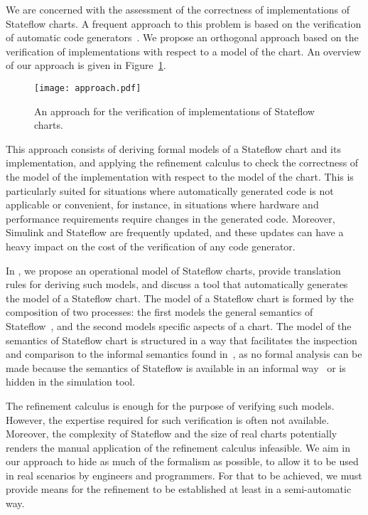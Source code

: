 \documentclass[submission]{eptcs}
\begin{document}
We are concerned with the assessment of the correctness of implementations of Stateflow charts.
A frequent approach to this problem is based on the verification of automatic code generators~\cite{Caspi2003,Toom2008,Lublinerman2009}. 
We propose an orthogonal approach based on the verification of implementations with respect to a model
of the chart. An overview of our approach is given in Figure~\ref{fig:approach}.


\begin{figure}
\centering
\texttt{[image: approach.pdf]}
\caption{An approach for the verification of implementations of Stateflow charts.}
\label{fig:approach}
\end{figure}

This approach consists of deriving formal models of a Stateflow chart and its implementation, and
applying the refinement calculus to check the correctness of the model of the implementation with respect to the model of the chart.
This is particularly suited for situations where automatically generated code is not applicable
or convenient, for instance, in situations where hardware and performance requirements require changes in the generated
code. Moreover, Simulink and Stateflow are frequently updated, and these updates can have
a heavy impact on the cost of the verification of any code generator.

In \cite{Miyazawa2011a}, we propose an operational model of Stateflow charts, provide translation rules for deriving such models, and discuss
a tool that automatically generates the model of a Stateflow chart. The model of a Stateflow chart is formed by the composition of two processes:
the first models the general semantics of Stateflow~\cite{Stateflow}, and the second models specific aspects of a chart.
The model of the semantics of Stateflow chart is structured in a way that facilitates the inspection and comparison to the informal semantics found in~\cite{Stateflow},
as no formal analysis can be made because the semantics of Stateflow is available in an informal way~\cite{Stateflow} or is hidden in the simulation tool.

The refinement calculus is enough for the purpose of verifying such models. However, the expertise required for such verification is often not available.
Moreover, the complexity of Stateflow and the size of real charts potentially renders the manual application of the refinement calculus infeasible. We aim
in our approach to hide as much of the formalism as possible, to allow it to be used in real scenarios by engineers and programmers. For that to be achieved, we must
provide means for the refinement to be established at least in a semi-automatic way.
\end{document}
